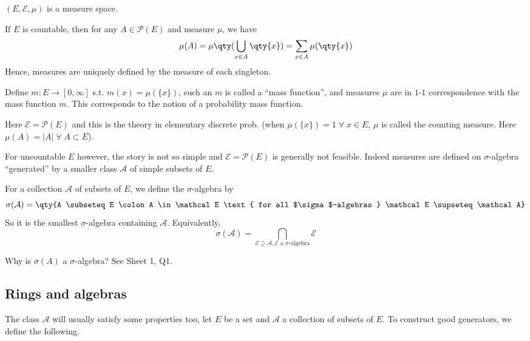 \begin{remark}
	$(E, \mathcal{E}, \mu)$ is a measure space.
\end{remark}

\begin{remark}
	If $E$ is countable, then for any $A \in \mathcal P(E)$ and measure $\mu$, we have
	\[ \mu(A) = \mu\qty(\bigcup_{x\in A} \qty{x}) = \sum_{x \in A} \mu(\qty{x}) \]
	Hence, measures are uniquely defined by the measure of each singleton.

	Define $m : E \to [0, \infty]$ s.t. $m(x) = \mu(\{x\})$, such an $m$ is called a ``mass function'', and measures $\mu$ are in $1$-$1$ correspondence with the mass function $m$.
	This corresponds to the notion of a probability mass function.

	Here $\mathcal{E} = \mathcal{P}(E)$ and this is the theory in elementary discrete prob. (when $\mu(\{x\}) = 1 \; \forall \; x \in E$, $\mu$ is called the counting measure. Here $\mu(A) = |A| \; \forall \; A \subset E$).

	For uncountable $E$  however, the story is not so simple and $\mathcal{E} = \mathcal{P}(E)$ is generally not feasible. Indeed measures are defined on $\sigma$-algebra ``generated'' by a smaller class $\mathcal{A}$ of simple subsets of $E$.
\end{remark}

\begin{definition}
	For a collection $\mathcal A$ of subsets of $E$, we define the $\sigma$-algebra  by
	\[ \sigma(\mathcal A) = \qty{A \subseteq E \colon A \in \mathcal E \text{ for all $\sigma$-algebras } \mathcal E \supseteq \mathcal A} \]
	So it is the smallest $\sigma$-algebra containing $\mathcal A$.
	Equivalently,
	\[ \sigma(\mathcal A) = \bigcap_{\mathcal E \supseteq \mathcal A, \mathcal E \text{ a $\sigma$-algebra}} \mathcal E \]
\end{definition}

\begin{question}
	Why is $\sigma(A)$ a $\sigma$-algebra? See Sheet 1, Q1.
\end{question}

\subsection{Rings and algebras}
The class $\mathcal{A}$ will usually satisfy some properties too, let $E$ be a set and $\mathcal{A}$ a collection of subsets of $E$.
To construct good generators, we define the following.

